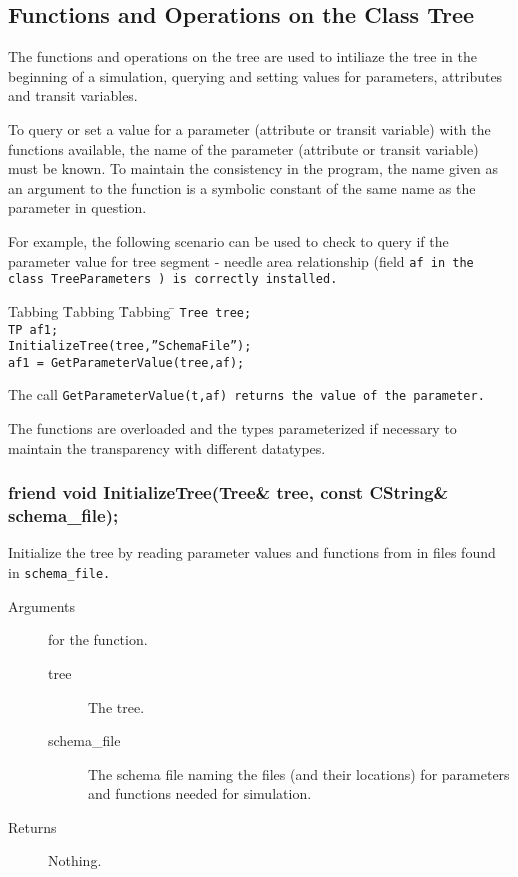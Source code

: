 \subsection{Functions and Operations on the Class Tree}

The functions and operations on the tree are used to intiliaze 
the tree in the beginning of a simulation, querying and setting
values for parameters, attributes and transit variables.

To query or set a value for a parameter (attribute or transit
variable) with the functions available, the name of the parameter
(attribute or transit variable) must be known.  To maintain the
consistency in the program, the name given as an argument to the
function is a symbolic constant of the same name as the parameter in
question. 

For example, the following scenario can be used to check to query if
the parameter value for tree segment - needle area relationship (field
\tt af \rm in the class \tt TreeParameters \rm) is correctly installed.

\begin{tabbing}
Tabbing \= Tabbing \= Tabbing \= \kill
\>\>\> \tt Tree tree; \\
\>\>\> \tt TP af1; \\
\>\>\> \tt InitializeTree(tree,''SchemaFile''); \\
\>\>\> \tt af1 = GetParameterValue(tree,af);
\end{tabbing}

The call \tt GetParameterValue(t,af) \rm returns the value of the
parameter.  

The functions are overloaded and the types parameterized
if necessary to maintain the transparency with different datatypes.

\subsubsection{friend void InitializeTree(Tree\& tree,
               const CString\& \\ schema\_file);}
Initialize the tree by reading parameter values and functions
from in files found in \tt  schema\_file\rm.
\begin{description}
  \item[Arguments] for the function.
    \begin{description}
      \item[tree] The tree.
      \item[schema\_file] The schema file naming
           the files (and their locations) for parameters and functions
           needed for simulation.
    \end{description}
 \item[Returns] Nothing.
\end{description}

